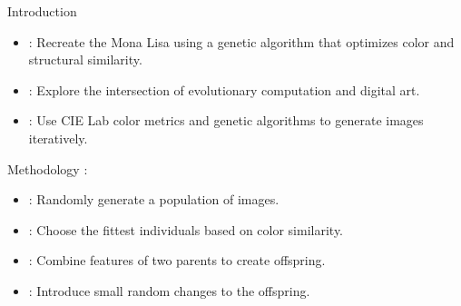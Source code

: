 \begin{frame}{Introduction}
    \begin{itemize}
        \item {}: Recreate the Mona Lisa using a genetic algorithm that optimizes color and structural similarity.
        \item {}: Explore the intersection of evolutionary computation and digital art.
        \item {}: Use CIE Lab color metrics and genetic algorithms to generate images iteratively.
    \end{itemize}
\end{frame}

\begin{frame}{Methodology}
    :
    \begin{itemize}
        \item {}: Randomly generate a population of images.
        \item {}: Choose the fittest individuals based on color similarity.
        \item {}: Combine features of two parents to create offspring.
        \item {}: Introduce small random changes to the offspring.
    \end{itemize}

\end{frame}

